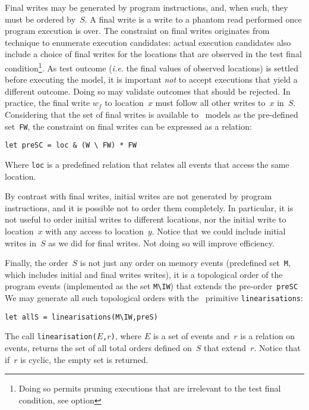 Final writes may be  generated by program instructions, and, when such,
they must be ordered by~$S$.
A final write is a write to a phantom read performed once
program execution is over.
The constraint on final writes
originates from \herd{} technique to enumerate execution candidates:
actual execution candidates also include a choice of final writes for
the locations that are observed in the test final condition\footnote{Doing
so permits pruning executions that are irrelevant to the test final condition,
see \herd{} option }.
As test outcome (\emph{i.e.} the final values of observed locations) is
settled before executing the model, it is important \emph{not} to accept
executions that yield a different outcome. Doing so may validate outcomes
that should be rejected.
In practice, the final write $w_f$
to location~$x$ must follow all other writes to~$x$ in~$S$.
Considering that the set of final writes is available to \cat{}~models
as the pre-defined set~\verb+FW+,
the  constraint on final writes
can be expressed as a relation:
\begin{verbatim}
let preSC = loc & (W \ FW) * FW
\end{verbatim}
Where \verb+loc+ is a predefined relation that relates all events
that access the same location.

By contrast with final writes, initial writes are not generated
by program instructions, and it is possible not to order them completely.
In particular, it is not useful to order initial writes to different locations,
nor the initial write to location~$x$ with any access to location~$y$.
Notice that we could include initial writes in~$S$ as we did for
final writes. Not doing so will improve efficiency.

\label{intro:linearisations}%
Finally, the order~$S$ is not just any order on memory events (predefined
set~\verb+M+, which includes initial and final writes writes),
it is a topological order of the program events (implemented as the set
\verb+M\IW+) that extends the pre-order~\verb+preSC+
We may generate all such topological orders with the \cat{}~primitive
\verb+linearisations+:
\begin{verbatim}
let allS = linearisations(M\IW,preS)
\end{verbatim}
The call \texttt{linearisation($E$,$r$)}, where $E$ is a set of events
and~$r$ is a relation on events, returns the set of all total
orders defined on~$S$ that extend~$r$. Notice that if~$r$ is cyclic,
the empty set is  returned.

